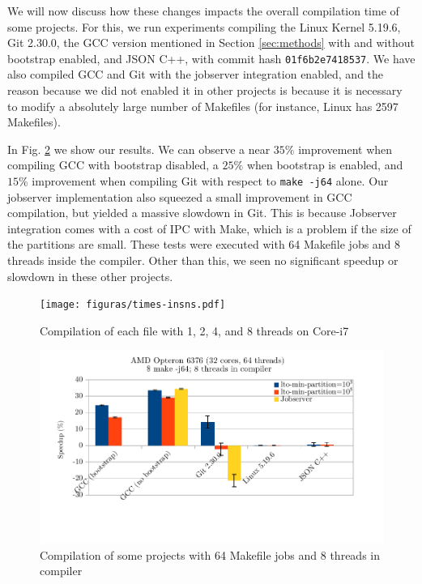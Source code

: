 \documentclass[runningheads]{llncs}
\begin{document}
We will now discuss how these changes impacts the overall compilation
time of some projects. For this, we run experiments compiling
the Linux Kernel 5.19.6, Git 2.30.0, the GCC version mentioned in
Section \ref{sec:methods} with and without bootstrap enabled, and JSON C++, with
commit hash \texttt{01f6b2e7418537}. We have also compiled GCC and
Git with the jobserver integration enabled, and the reason because
we did not enabled it in other projects is because it is necessary
to modify a absolutely large number of Makefiles (for instance, Linux
has 2597 Makefiles). 

In Fig. \ref{fig:gcc_projects} we show our results. We can observe
a near $35\%$ improvement when compiling GCC with bootstrap disabled,
a $25\%$ when bootstrap is enabled, and $15\%$
improvement when compiling Git with respect to
\texttt{make -j64} alone. Our jobserver implementation also
squeezed a small improvement in GCC compilation, but yielded a massive
slowdown in Git. This is because Jobserver integration comes with
a cost of IPC with Make, which is a problem if the size of the partitions
are small.  These tests were executed with 64 Makefile
jobs and 8 threads inside the compiler. Other than this, we seen
no significant speedup or slowdown in these other projects.

\begin{figure}
\centering
	 \texttt{[image: figuras/times-insns.pdf]}
	  \caption{Compilation of each file with 1, 2, 4, and 8 threads on
	  Core-i7}
	  \label{fig:gcc_all_files}
\end{figure}

\begin{figure}
\centering
	 \includegraphics[scale=0.8]{figuras/experiment_projects_new.pdf}
	  \caption{Compilation of some projects with 64 Makefile jobs and 8 threads in compiler}
	  \label{fig:gcc_projects}
\end{figure}
\end{document}
